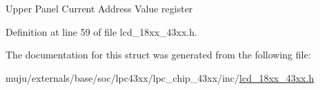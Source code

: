 Upper Panel Current Address Value register 

Definition at line 59 of file lcd\+\_\+18xx\+\_\+43xx.\+h.



The documentation for this struct was generated from the following file\+:\begin{DoxyCompactItemize}
\item 
muju/externals/base/soc/lpc43xx/lpc\+\_\+chip\+\_\+43xx/inc/\hyperlink{lcd__18xx__43xx_8h}{lcd\+\_\+18xx\+\_\+43xx.\+h}\end{DoxyCompactItemize}
